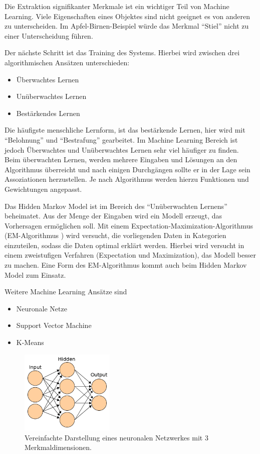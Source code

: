 Die Extraktion signifikanter Merkmale ist ein wichtiger Teil von Machine Learning. Viele Eigenschaften eines Objektes sind nicht geeignet es von anderen zu unterscheiden. Im Apfel-Birnen-Beispiel würde das Merkmal ``Stiel'' nicht zu einer Unterscheidung führen.

Der nächste Schritt ist das Training des Systems. Hierbei wird zwischen drei algorithmischen Ansätzen unterschieden:
\begin{itemize}
\item Überwachtes Lernen
\item Unüberwachtes Lernen
\item Bestärkendes Lernen
\end{itemize}
Die häufigste menschliche Lernform, ist das bestärkende Lernen, hier wird mit ``Belohnung'' und ``Bestrafung'' gearbeitet. 
Im Machine Learning Bereich ist jedoch Überwachtes und Unüberwachtes Lernen sehr viel häufiger zu finden. Beim überwachten Lernen, werden mehrere Eingaben und Lösungen an den Algorithmus überreicht und nach einigen Durchgängen sollte er in der Lage  sein Assoziationen herzustellen. Je nach Algorithmus werden hierzu Funktionen und Gewichtungen angepasst. 

Das Hidden Markov Model ist im Bereich des ``Unüberwachten Lernens'' beheimatet. Aus der Menge der Eingaben wird ein Modell erzeugt, das Vorhersagen ermöglichen soll. Mit einem Expectation-Maximization-Algorithmus (EM-Algorithmus \cite{emalgo}) wird versucht, die vorliegenden Daten in Kategorien einzuteilen, sodass die Daten optimal erklärt werden. Hierbei wird versucht in einem zweistufigen Verfahren (Expectation und Maximization), das Modell besser zu machen. 
Eine Form des EM-Algorithmus kommt auch beim Hidden Markov Model zum Einsatz.

Weitere Machine Learning Ansätze sind 
\begin{itemize}
\item Neuronale Netze
\item Support Vector Machine
\item K-Means
\end{itemize} 

\begin{figure}[htbp] \centering
    \includegraphics[width=0.4\textwidth]{Bilder/Kap1/neuralnetwork}
    \caption{ Vereinfachte Darstellung eines neuronalen Netzwerkes mit 3 Merkmaldimensionen. }
    \label{fig:neural}
\end{figure}

